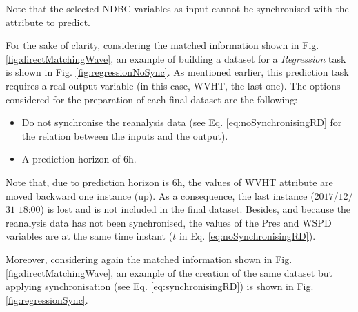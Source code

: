 \documentclass[energies,article,submit,moreauthors,pdftex]{Definitions/mdpi}
\begin{document}
\begin{itemize}
						Note that the selected NDBC variables as input cannot be synchronised with the attribute to predict.
						
 						For the sake of clarity, considering the matched information shown in Fig. \ref{fig:directMatchingWave}, an example of building a dataset for a \textit{Regression} task is shown in Fig. \ref{fig:regressionNoSync}. As mentioned earlier, this prediction task requires a real output variable (in this case, WVHT, the last one). The options considered for the preparation of each final dataset are the following:
 							\begin{itemize}
 								\item Do not synchronise the reanalysis data (see Eq. \ref{eq:noSynchronisingRD} for the relation between the inputs and the output).
 								\item A prediction horizon of $6$h.
 							\end{itemize}
							
 						Note that, due to prediction horizon is $6$h, the values of WVHT attribute are moved backward one instance (up). As a consequence, the last instance ($2017$/$12$/$31$ $18$:$00$) is lost and is not included in the final dataset. Besides, and because the reanalysis data has not been synchronised, the values of the Pres and WSPD variables are at the same time instant ($t$ in Eq. \ref{eq:noSynchronisingRD}).
						
 						Moreover, considering again the matched information shown in Fig. \ref{fig:directMatchingWave}, an example of the creation of the same dataset but applying synchronisation (see Eq. \ref{eq:synchronisingRD}) is shown in Fig. \ref{fig:regressionSync}.
						

\end{itemize}
\end{document}
